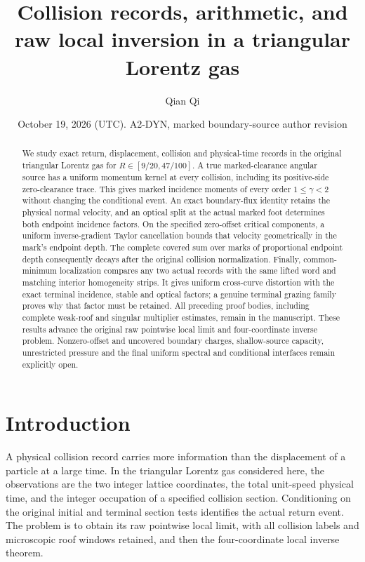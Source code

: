 \documentclass[11pt,reqno]{amsart}
\title[Collision records and raw local inversion]{Collision records, arithmetic, and raw local inversion in a triangular Lorentz gas}
\author{Qian Qi}
\date{October 19, 2026 (UTC). A2-DYN, marked boundary-source author revision}
\numberwithin{equation}{section}
\theoremstyle{definition}\newtheorem{definition}[theorem]{Definition}
\theoremstyle{remark}\newtheorem{remark}[theorem]{Remark}
\begin{document}
\raggedbottom
\begin{abstract}
We study exact return, displacement, collision and physical-time records
in the original triangular Lorentz gas for $R\in[9/20,47/100]$.
A true marked-clearance angular source has a uniform momentum kernel
at every collision, including its positive-side zero-clearance trace.
This gives marked incidence moments of every order $1\le\gamma<2$
without changing the conditional event.
An exact boundary-flux identity retains the physical normal velocity,
and an optical split at the actual marked foot determines both endpoint
incidence factors. On the specified zero-offset critical components,
a uniform inverse-gradient Taylor cancellation bounds that velocity
geometrically in the mark's endpoint depth. The complete covered
sum over marks of proportional endpoint depth consequently decays
after the original collision normalization.
Finally, common-minimum localization compares any two actual records
with the same lifted word and matching interior homogeneity strips.
It gives uniform cross-curve distortion with the exact terminal
incidence, stable and optical factors; a genuine terminal grazing
family proves why that factor must be retained.
All preceding proof bodies, including complete weak-roof and singular
multiplier estimates, remain in the manuscript.
These results advance the original raw pointwise local limit and
four-coordinate inverse problem. Nonzero-offset and uncovered boundary
charges, shallow-source capacity, unrestricted pressure and the final
uniform spectral and conditional interfaces remain explicitly open.
\end{abstract}
\maketitle
\enlargethispage{6pt}

\section*{Introduction}
A physical collision record carries more information than the
displacement of a particle at a large time.  In the triangular
Lorentz gas considered here, the observations are the two integer
lattice coordinates, the total unit-speed physical time, and the
integer occupation of a specified collision section.  Conditioning
on the original initial and terminal section tests identifies the
actual return event.  The problem is to obtain its raw pointwise
local limit, with all collision labels and microscopic roof windows
retained, and then the four-coordinate local inverse theorem.
\end{document}
